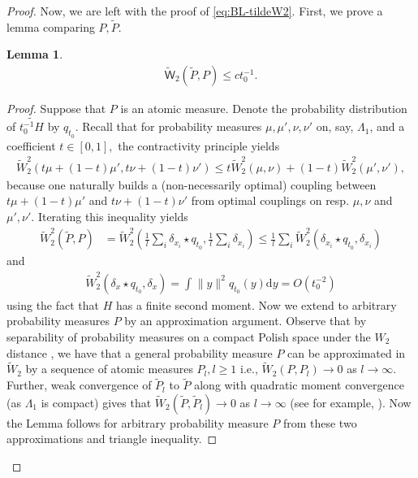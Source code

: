 \documentclass[12pt]{article}
\newtheorem{lemma}[theorem]{Lemma}
\newcommand{\tW}{ \widetilde{\mathsf W}}
\newcommand{\1}{\mathbf{1}}
\newcommand{\md}{\mathrm{d}}
\renewcommand{\footnote}[1]{}
\begin{document}
{{{{{\begin{proof}
Now, we are left with the proof of \eqref{eq:BL-tildeW2}. First, we prove a lemma comparing $P,\tilde P$.
%
\begin{lemma}
\label{l:W2PtP}
        \begin{align*}
\tW_{2}(\tilde P ,P )\leqslant ct_0^{-1}.
\end{align*}
\end{lemma}
%
\begin{proof}
 {Suppose that $P$ is an atomic measure. Denote the probability distribution of $\widetilde{t_0^{-1} H}$ by $q_{t_0}$.}
  {Recall that for probability measures $\mu ,\mu ',\nu ,\nu '$ on, say, $\Lambda _{1}$, and a coefficient $t\in [0,1],$
 the contractivity principle yields
\begin{align*}
\tilde W_{2}^{2}(t \mu+(1-t )\mu ' ,t \nu +(1-t) \nu ')\leqslant t \tilde W_{2}^{2}(\mu ,\nu )+(1-t ) \tilde W_{2}^{2}(\mu ' ,\nu '),
\end{align*}
because one naturally builds a (non-necessarily optimal) coupling between $t\mu +(1-t)\mu '$ and $t\nu +(1-t)\nu '$ from optimal couplings on resp. $\mu ,\nu $ and $\mu' ,\nu  '.$
 Iterating this inequality yields}
\begin{align*}
\tilde W_{2}^2(\tilde P ,P ) &= \tilde W_{2}^{2}(\frac{ 1}{l}\sum_{i}\delta _{x_{i}}\star q_{t_0},\frac{1}{l}\sum_{i}\delta _{x_{i}})
 \leqslant \frac{ 1}{l}\sum_{i}\tilde W_{2}^{2}(\delta _{x_{i}}\star q_{t_0},\delta _{x_{i}})
\end{align*}
%
and
%
\begin{align*}
\tilde W_{2}^{2}(\delta _{x}\star q_{t_0},\delta _{x})= \int_{}\|y\|^{2}q_{t_0}(y)\md y = O(t_0^{-2})
\end{align*}
%
using the fact that $ H$ has a finite {second} moment. {Now we extend to arbitrary probability measures $P$ by an approximation argument. Observe that by separability of probability measures on a compact Polish space under the $W_2$ distance \cite[Corollary 8.11]{ambrosio2021lectures}, we have that a general probability measure $P$ can be approximated in $\tilde W_2$ by a sequence of atomic measures $P_l, l \geq 1$ i.e., $\tilde W_2(P,P_l) \to 0$ as $l \to \infty$. Further, weak convergence of $\tilde P_l$ to $\tilde P$ along with quadratic moment convergence (as $\Lambda_1$ is compact) gives that  $\tilde W_2(\tilde P,\tilde P_l) \to 0$ as $l \to \infty$ (see for example, \cite[Theorem 8.8]{ambrosio2021lectures}). Now the Lemma follows for arbitrary probability measure $P$ from these two approximations and triangle inequality.}

\end{proof}
\end{proof}}}}}}
\end{document}
